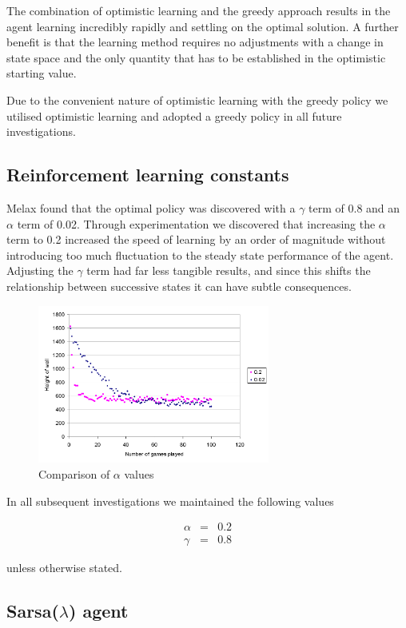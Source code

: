 \documentclass{rucsthesis}
\begin{document}
The combination of optimistic learning and the greedy approach results in the agent learning incredibly rapidly and settling on the optimal solution. A further benefit is that the learning method requires no adjustments with a change in state space and the only quantity that has to be established in the optimistic starting value.

Due to the convenient nature of optimistic learning with the greedy policy we utilised optimistic learning and adopted a greedy policy in all future investigations.

\subsection{Reinforcement learning constants}

Melax found that the optimal policy was discovered with a $\gamma$ term of 0.8 and an $\alpha$ term of 0.02. Through experimentation we discovered that increasing the $\alpha$ term to 0.2 increased the speed of learning by an order of magnitude without introducing too much fluctuation to the steady state performance of the agent. Adjusting the $\gamma$ term had far less tangible results, and since this shifts the relationship between successive states it can have subtle consequences.

\begin{figure}[h]
\centering
\includegraphics[width=3in]{alphacomp.png}
\caption{Comparison of $\alpha$ values}
\label{fig:alpha}
\end{figure} 

In all subsequent investigations we maintained the following values

\begin{eqnarray*}
\alpha & = & 0.2 \\
\gamma & = & 0.8
\end{eqnarray*}

unless otherwise stated.

\subsection{Sarsa($\lambda$) agent}
\end{document}
